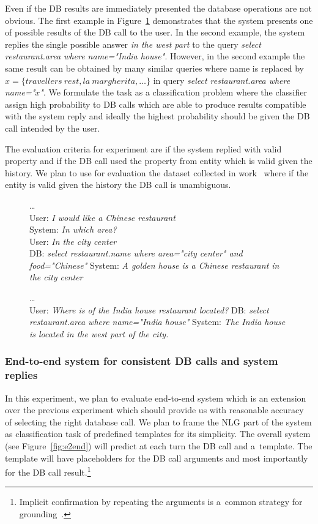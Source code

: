 \documentclass[11pt]{article}
\def\sys#1{{\color{purple}System: \it #1}}
\def\usr#1{{\color{brown}User: \it #1}}
\def\api#1{{\color{green}DB: \it #1}}
\begin{document}
Even if the DB results are immediately presented the database operations are not obvious.  
The first example in Figure~\ref{fig:apicall} demonstrates that the system presents one of possible results of the DB call to the user.
In the second example, the system replies the single possible answer {\it in the west part} to the query {\it select restaurant.area where name="India house"}.
However, in the second example the same result can be obtained by many similar queries where name is replaced by $x=\{travellers\ rest, la\ margherita, \ldots\}$ in query {\it select restaurant.area where name="$x$"}.
We formulate the task as a classification problem where the classifier assign high probability to DB calls which are able to produce results compatible with the system reply and ideally the highest probability should be given the DB call intended by the user.

The evaluation criteria for experiment are if the system replied with valid property and if the DB call used the property from entity which is valid given the history.
We plan to use for evaluation the dataset collected in work~\cite{platek2016wochat} where if the entity is valid given the history the DB call is unambiguous. 

\begin{figure}
    \dots \\
    \usr{I would like a Chinese restaurant} \\
    \sys{In which area?} \\
    \usr{In the city center} \\
    \api{select restaurant.name where area="city center" and food="Chinese"}
    \sys{A golden house is a Chinese restaurant in the city center} 

    \dots \\
    \usr{Where is of the India house restaurant located?}
    \api{select restaurant.area where name="India house"}
    \sys{The India house is located in the west part of the city.}
    \caption{}
    \label{fig:apicall}
\end{figure}


\subsubsection*{End-to-end system for consistent DB calls and system replies}
In this experiment, we plan to evaluate end-to-end system which is an extension over the previous experiment which should provide us with reasonable accuracy of selecting the right database call.
We plan to frame the NLG part of the system as classification task of predefined templates for its simplicity.
The overall system (see Figure~\ref{fig:e2end}) will predict at each turn the DB call and a~template.
The template will have placeholders for the DB call arguments and most importantly for the DB call result.\footnote{Implicit confirmation by repeating the arguments is a~common strategy for grounding~\cite{meena_crowdsourcing_2014}.}
\end{document}
